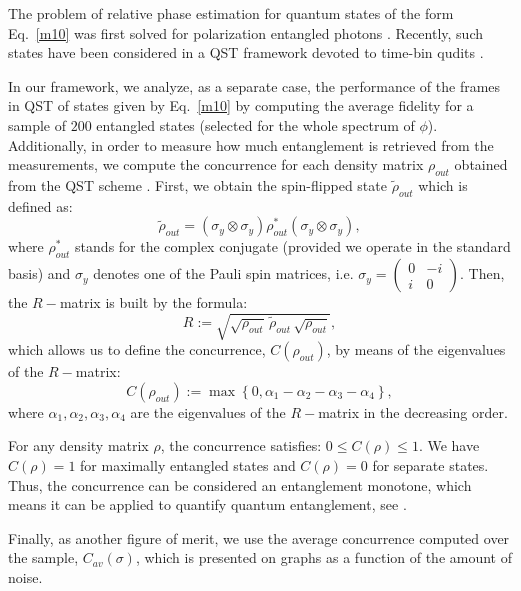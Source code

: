 \documentclass[aps,pra,reprint,groupedaddress,showkeys]{revtex4-1}
\renewcommand{\eqref}[1]{Eq.~\ref{#1}}
\begin{document}
The problem of relative phase estimation for quantum states of the form \eqref{m10} was first solved for polarization entangled photons \cite{White1999}. Recently, such states have been considered in a QST framework devoted to time-bin qudits \cite{SedziakKacprowicz2020}.

In our framework, we analyze, as a separate case, the performance of the frames in QST of states given by \eqref{m10} by computing the average fidelity for a sample of $200$ entangled states (selected for the whole spectrum of $\phi$). Additionally, in order to measure how much entanglement is retrieved from the measurements, we compute the concurrence for each density matrix $\rho_{out}$ obtained from the QST scheme \cite{Hill1997,Wootters1998}. First, we obtain the spin-flipped state $\tilde{\rho}_{out}$ which is defined as:
\begin{equation}\label{m11}
\tilde{\rho}_{out} = \left(\sigma_y \otimes \sigma_y \right) \rho^*_{out} \left(\sigma_y \otimes \sigma_y \right),
\end{equation}
where $\rho^*_{out}$ stands for the complex conjugate (provided we operate in the standard basis) and $\sigma_y$ denotes one of the Pauli spin matrices, i.e. $\sigma_y = \begin{pmatrix} 0 & -i \\ i & 0 \end{pmatrix}$. Then, the $R-$matrix is built by the formula:
\begin{equation}\label{m12}
R := \sqrt{\sqrt{\rho_{out}} \,\tilde{\rho}_{out}\, \sqrt{\rho_{out}}},
\end{equation}
which allows us to define the concurrence, $C(\rho_{out})$, by means of the eigenvalues of the $R-$matrix:
\begin{equation}\label{m13}
C(\rho_{out}) := \max \left\{0, \alpha_1 - \alpha_2 - \alpha_3 -\alpha_4   \right\},
\end{equation}
where $\alpha_1, \alpha_2, \alpha_3, \alpha_4$ are the eigenvalues of the $R-$matrix in the decreasing order.

For any density matrix $\rho$, the concurrence satisfies: $0\leq C(\rho) \leq 1$. We have $C(\rho) = 1$ for maximally entangled states and $C(\rho) = 0$ for separate states. Thus, the concurrence can be considered an entanglement monotone, which means it can be applied to quantify quantum entanglement, see \cite{Buchleitner2007}.

Finally, as another figure of merit, we use the average concurrence computed over the sample, $C_{av} (\sigma)$, which is presented on graphs as a function of the amount of noise. 
\end{document}
